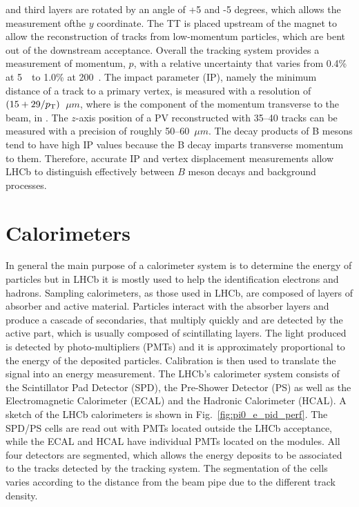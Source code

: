 and third layers are rotated by an angle of +5 and -5 degrees, which allows the measurement ofthe $y$ coordinate. 
The TT is placed upstream of the magnet to allow the reconstruction of tracks from low-momentum particles,
which are bent out of the downstream acceptance. Overall the tracking system provides a measurement of momentum, 
$p$,  with a relative uncertainty that varies from 0.4\% at 5~\gevc~to 1.0\% at 200~\gevc. 
The impact parameter (IP), namely the minimum distance of a track to a primary vertex, is measured 
with a resolution of $(15 + 29/\mbox{$p_{\rm T}$})$~$\mu m$, where \pt is the component of the momentum transverse to the 
beam, in \gevc. The $z$-axis position of a PV reconstructed with 35--40 tracks can be measured with a precision 
of roughly 50--60~$\mu m$. The decay products of B mesons tend to have high IP values because the B decay imparts
transverse momentum to them. Therefore, accurate IP and vertex displacement measurements allow LHCb to distinguish 
effectively between $B$ meson decays and background processes. 


\section{Calorimeters}
\label{sec:calorimeters}

In general the main purpose of a calorimeter system is to determine the energy of particles
but in LHCb it is mostly used to help the identification electrons and hadrons. 
Sampling calorimeters, as those used in LHCb, are composed of layers of absorber and active material.
Particles interact with the absorber layers and produce a cascade of secondaries, that multiply quickly and are detected by the active part,
which is usually composed of scintillating layers. The light produced is detected by photo-multipliers (PMTs) and it is approximately
proportional to the energy of the deposited particles. Calibration is then used to translate the signal into an energy measurement. 
The LHCb's calorimeter system consists of the Scintillator Pad Detector (SPD), the Pre-Shower Detector (PS)
as well as the Electromagnetic Calorimeter (ECAL) and the Hadronic Calorimeter (HCAL).
A sketch of the LHCb calorimeters is shown in Fig.~\ref{fig:pi0_e_pid_perf}. 
The SPD/PS cells are read out with PMTs located outside the LHCb acceptance, while the ECAL and HCAL
have individual PMTs located on the modules. All four detectors are segmented, which allows the energy
deposits to be associated to the tracks detected by the tracking system. The segmentation of the cells
varies according to the distance from the beam pipe due to the different track density.

